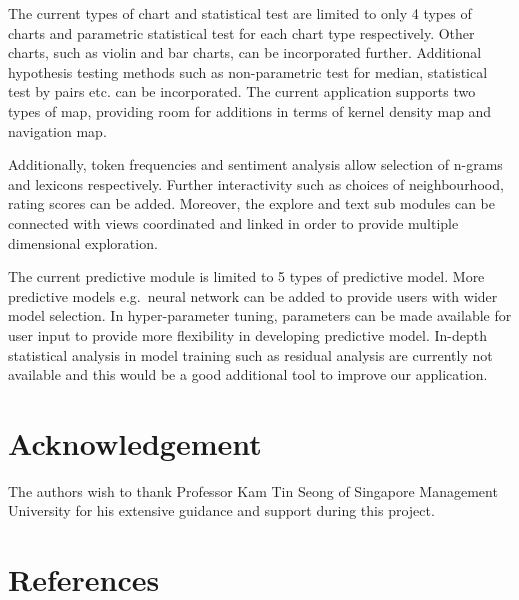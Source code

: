 \documentclass{acm_proc_article-sp}
\begin{document}
The current types of chart and statistical test are limited to only 4
types of charts and parametric statistical test for each chart type
respectively. Other charts, such as violin and bar charts, can be
incorporated further. Additional hypothesis testing methods such as
non-parametric test for median, statistical test by pairs etc. can be
incorporated. The current application supports two types of map,
providing room for additions in terms of kernel density map and
navigation map.

Additionally, token frequencies and sentiment analysis allow selection
of n-grams and lexicons respectively. Further interactivity such as
choices of neighbourhood, rating scores can be added. Moreover, the
explore and text sub modules can be connected with views coordinated and
linked in order to provide multiple dimensional exploration.

The current predictive module is limited to 5 types of predictive model.
More predictive models e.g.~neural network can be added to provide users
with wider model selection. In hyper-parameter tuning, parameters can be
made available for user input to provide more flexibility in developing
predictive model. In-depth statistical analysis in model training such
as residual analysis are currently not available and this would be a
good additional tool to improve our application.

\hypertarget{acknowledgement}{%
\section{Acknowledgement}\label{acknowledgement}}

The authors wish to thank Professor Kam Tin Seong of Singapore
Management University for his extensive guidance and support during this
project.

\hypertarget{references}{%
\section*{References}\label{references}}
\end{document}
